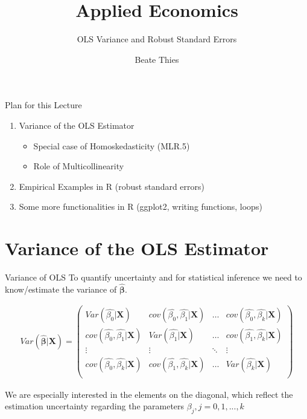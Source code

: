 \documentclass[11pt, aspectratio = 169]{beamer}
\title{Applied Economics}
\subtitle{OLS Variance and Robust Standard Errors}
\author{Beate Thies}
\date{}
\institute{Winter 2024/25}
\begin{document}


\maketitle

\begin{frame}{Plan for this Lecture}
\begin{enumerate}
    \item Variance of the OLS Estimator
     \begin{itemize}
        \item Special case of Homoskedasticity (MLR.5)
        \item Role of Multicollinearity
    \end{itemize}
    \item Empirical Examples in R (robust standard errors)
    \item Some more functionalities in R (ggplot2, writing functions, loops)
\end{enumerate}
\end{frame}
\section{Variance of the OLS Estimator}

\begin{frame}{Variance of OLS}
    To quantify uncertainty and for statistical inference we need to know/estimate the variance of $\hat{\boldsymbol{\beta}}$.

\begin{align*}
Var(\hat{\boldsymbol{\beta}}|\mathbf{X}) =  \begin{pmatrix}
                                            Var(\hat{\beta_0}|\mathbf{X}) & cov(\hat{\beta_0}, \hat{\beta_1}|\mathbf{X})  & \ldots & cov(\hat{\beta_0}, \hat{\beta_k}|\mathbf{X})   \\
                                            cov(\hat{\beta_0}, \hat{\beta_1}|\mathbf{X})  & Var(\hat{\beta_1}|\mathbf{X})  & \ldots & cov(\hat{\beta_1}, \hat{\beta_k}|\mathbf{X})      \\
                                            \vdots & \vdots   & \ddots & \vdots \\
                                            cov(\hat{\beta_0}, \hat{\beta_k}|\mathbf{X})  &  cov(\hat{\beta_1}, \hat{\beta_k}|\mathbf{X})  & \ldots & Var(\hat{\beta_k}|\mathbf{X}) \\
                                            \end{pmatrix}
\end{align*}

We are especially interested in the elements on the diagonal, which reflect the estimation uncertainty regarding the parameters $\beta_j, j = 0,1,...,k$
\end{frame}
\end{document}
